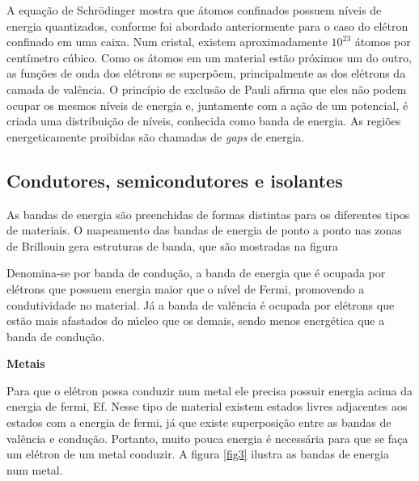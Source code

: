 \par A equação de Schrödinger mostra que átomos confinados possuem níveis de energia quantizados, conforme foi abordado anteriormente para o caso do elétron confinado em uma caixa. Num cristal, existem aproximadamente $10^{23}$ átomos por centímetro cúbico. Como os átomos em um material estão próximos um do outro, as funções de onda dos elétrons se superpõem, principalmente as dos elétrons da camada de valência. O princípio de exclusão de Pauli afirma que eles não podem ocupar os mesmos níveis de energia e, juntamente com a ação de um potencial, é criada uma distribuição de níveis, conhecida como banda de energia. As regiões energeticamente proibidas são chamadas de \textit{gaps} de energia\cite{qm_fis6}.

\subsection{Condutores, semicondutores e isolantes}

	\par As bandas de energia\cite{qm_fis6} são preenchidas de formas distintas para os diferentes tipos de materiais. O mapeamento das bandas de energia de ponto a ponto nas zonas de Brillouin gera estruturas de banda, que são mostradas na figura


	\par Denomina-se por banda de condução, a banda de energia que é ocupada por elétrons que possuem energia maior que o nível de Fermi, promovendo a condutividade no material. Já a banda de valência é ocupada por elétrons que estão mais afastados do núcleo que os demais, sendo menos energética que a banda de condução.  

	\par \textbf{Metais}
	
	\par Para que o elétron possa conduzir num metal ele precisa possuir energia acima da energia de fermi, Ef. Nesse tipo de material existem estados livres adjacentes aos estados com a energia de fermi, já que existe superposição entre as bandas de valência e condução. Portanto, muito pouca energia é necessária para que se faça um elétron de um metal conduzir. A figura \ref{fig3} ilustra as bandas de energia num metal. 

